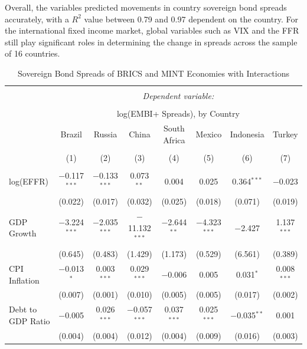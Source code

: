\documentclass[12pt]{article}
\begin{document}
Overall, the variables predicted movements in country sovereign bond spreads accurately, with a $R^{2}$ value between 0.79 and 0.97 dependent on the country. For the international fixed income market, global variables such as VIX and the FFR still play significant roles in determining the change in spreads across the sample of 16 countries.
%
\begin{landscape}
\begin{table}[!htbp] \centering 
  \caption{Sovereign Bond Spreads of BRICS and MINT Economies with Interactions} 
  \label{tbl4} 
\scriptsize 
\begin{tabular}{@{\extracolsep{5pt}}lccccccc} 
\\[-1.8ex]\hline 
\hline \\[-1.8ex] 
 & \multicolumn{7}{c}{\textit{Dependent variable:}} \\ 
\cline{2-8} 
\\[-1.8ex] & \multicolumn{7}{c}{log(EMBI+ Spreads), by Country} \\ 
 & Brazil & Russia & China & South Africa & Mexico & Indonesia & Turkey \\ 
\\[-1.8ex] & (1) & (2) & (3) & (4) & (5) & (6) & (7)\\ 
\hline \\[-1.8ex] 
 log(EFFR) & $-$0.117$^{***}$ & $-$0.133$^{***}$ & 0.073$^{**}$ & 0.004 & 0.025 & 0.364$^{***}$ & $-$0.023 \\ 
  & (0.022) & (0.017) & (0.032) & (0.025) & (0.018) & (0.071) & (0.019) \\ 
  GDP Growth & $-$3.224$^{***}$ & $-$2.035$^{***}$ & $-$11.132$^{***}$ & $-$2.644$^{**}$ & $-$4.323$^{***}$ & $-$2.427 & 1.137$^{***}$ \\ 
  & (0.645) & (0.483) & (1.429) & (1.173) & (0.529) & (6.561) & (0.389) \\ 
  CPI Inflation & $-$0.013$^{*}$ & 0.003$^{***}$ & 0.029$^{***}$ & $-$0.006 & 0.005 & 0.031$^{*}$ & 0.008$^{***}$ \\ 
  & (0.007) & (0.001) & (0.010) & (0.005) & (0.005) & (0.017) & (0.002) \\ 
  Debt to GDP Ratio & $-$0.005 & 0.026$^{***}$ & $-$0.057$^{***}$ & 0.037$^{***}$ & 0.025$^{***}$ & $-$0.035$^{**}$ & 0.001 \\ 
  & (0.004) & (0.004) & (0.012) & (0.004) & (0.009) & (0.016) & (0.003) \\ 

\end{tabular}
\end{table}
\end{landscape}
\end{document}
